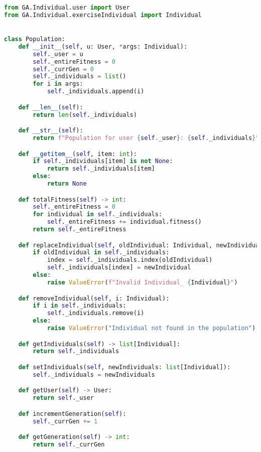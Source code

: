 \documentclass{article}
\begin{document}
\pagebreak

\begin{lstlisting}[language=Python, breaklines, no caption]
from GA.Individual.user import User
from GA.Individual.exerciseIndividual import Individual


class Population:
    def __init__(self, u: User, *args: Individual):
        self._user = u
        self._entireFitness = 0
        self._currGen = 0
        self._individuals = list()
        for i in args:
            self._individuals.append(i)

    def __len__(self):
        return len(self._individuals)

    def __str__(self):
        return f"Population for user {self._user}: {self._individuals}"

    def __getitem__(self, item: int):
        if self._individuals[item] is not None:
            return self._individuals[item]
        else:
            return None

    def totalFitness(self) -> int:
        self._entireFitness = 0
        for individual in self._individuals:
            self._entireFitness += individual.fitness()
        return self._entireFitness

    def replaceIndividual(self, oldIndividual: Individual, newIndividual: Individual):
        if oldIndividual in self._individuals:
            index = self._individuals.index(oldIndividual)
            self._individuals[index] = newIndividual
        else:
            raise ValueError(f"Invalid Individual_ {Individual}")

    def removeIndividual(self, i: Individual):
        if i in self._individuals:
            self._individuals.remove(i)
        else:
            raise ValueError("Individual not found in the population")

    def getIndividuals(self) -> list[Individual]:
        return self._individuals

    def setIndividuals(self, newIndividuals: list[Individual]):
        self._individuals = newIndividuals

    def getUser(self) -> User:
        return self._user

    def incrementGeneration(self):
        self._currGen += 1

    def getGeneration(self) -> int:
        return self._currGen
\end{lstlisting}

\pagebreak
\end{document}
